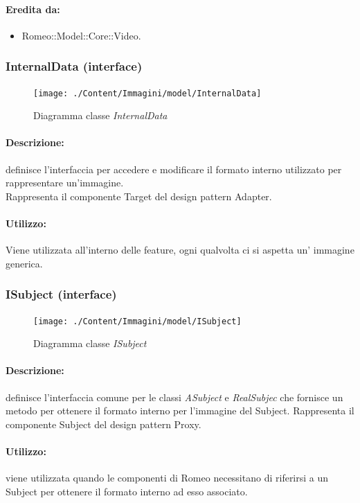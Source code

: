 	\paragraph{Eredita da:}
		\begin{itemize}
			\item Romeo::Model::Core::Video.
		\end{itemize}
	\subsubsection{InternalData (interface)}
	\begin{figure}[!h]
		\centering
		\texttt{[image: ./Content/Immagini/model/InternalData]}
		\caption{Diagramma classe \textsl{InternalData}}
	\end{figure}
	\paragraph{Descrizione:} definisce l'interfaccia per accedere e modificare il formato interno utilizzato per rappresentare un'immagine.
\\Rappresenta il componente Target del design pattern\g{} Adapter.
	\paragraph{Utilizzo:} Viene utilizzata all'interno delle feature, ogni qualvolta ci si aspetta un' immagine generica.
	\subsubsection{ISubject (interface)}
	\begin{figure}[!h]
		\centering
		\texttt{[image: ./Content/Immagini/model/ISubject]}
		\caption{Diagramma classe \textsl{ISubject}}
	\end{figure}
	\paragraph{Descrizione:} definisce l’interfaccia comune per le classi \textsl{ASubject} e \textsl{RealSubjec} che fornisce un metodo per ottenere il formato interno per l’immagine del Subject\g{}.
Rappresenta il componente Subject del design pattern\g{} Proxy.
	\paragraph{Utilizzo:} viene utilizzata quando le componenti di Romeo\g{} necessitano di riferirsi a un Subject\g{} per ottenere il formato interno ad esso associato.
